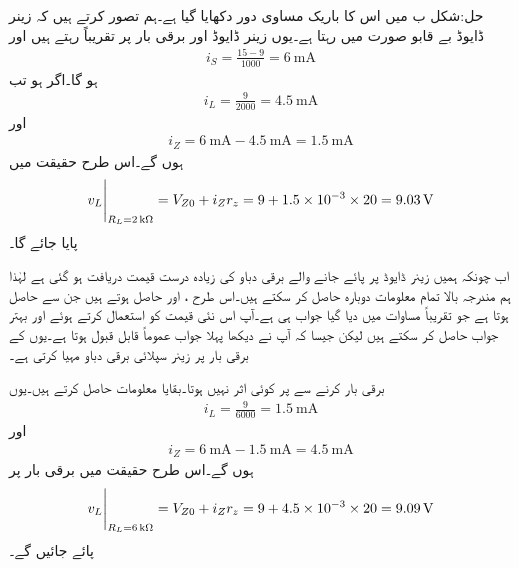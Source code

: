 حل:شکل  ب میں اس کا باریک مساوی دور دکھایا گیا ہے۔ہم تصور کرتے ہیں کہ زینر ڈایوڈ بے قابو صورت میں رہتا ہے۔یوں زینر ڈایوڈ اور برقی بار پر تقریباً  رہتے ہیں اور
\begin{align*}
i_S=\frac{15-9}{1000}=\SI{6}{\milli \ampere}
\end{align*}
ہو گا۔اگر  ہو تب
\begin{align*}
i_L=\frac{9}{2000}=\SI{4.5}{\milli \ampere}
\end{align*}
اور
\begin{align*}
i_Z=\SI{6}{\milli \ampere}-\SI{4.5}{\milli \ampere}=\SI{1.5}{\milli \ampere}
\end{align*}
ہوں گے۔اس طرح حقیقت میں
\begin{align}\label{مساوات_ڈایوڈ_زینر_سپلائی_جواب}
\eval{v_{L}}_{R_L=\SI{2}{\kilo \ohm}}=V_{Z0}+i_Z r_z=9+1.5 \times 10^{-3} \times 20=\SI{9.03}{\volt}
\end{align}
پایا جائے گا۔

اب چونکہ ہمیں زینر ڈایوڈ پر پائے جانے والے برقی دباو کی زیادہ درست قیمت دریافت ہو گئی ہے لہٰذا ہم مندرجہ بالا تمام معلومات دوبارہ حاصل کر سکتے  ہیں۔اس طرح ،   اور  حاصل ہوتے ہیں جن سے  حاصل ہوتا ہے جو تقریباً مساوات  میں دیا گیا جواب ہی ہے۔آپ اس نئی قیمت کو استعمال کرتے ہوئے اور بہتر جواب حاصل کر سکتے ہیں لیکن جیسا کہ آپ نے دیکھا پہلا جواب عموماً قابل قبول ہوتا ہے۔یوں  کے برقی بار پر زینر سپلائی  برقی دباو مہیا کرتی ہے۔

برقی بار  کرنے سے  پر کوئی اثر نہیں ہوتا۔بقایا معلومات حاصل کرتے ہیں۔یوں
\begin{align*}
i_L=\frac{9}{6000}=\SI{1.5}{\milli \ampere}
\end{align*}
اور
\begin{align*}
i_Z=\SI{6}{\milli \ampere}-\SI{1.5}{\milli \ampere}=\SI{4.5}{\milli \ampere}
\end{align*}
ہوں گے۔اس طرح حقیقت میں برقی بار پر
\begin{align}\label{مساوات_ڈایوڈ_زینر_سپلائی_جواب_الف}
\eval{v_{L}}_{R_L=\SI{6}{\kilo \ohm}}=V_{Z0}+i_Z r_z=9+4.5 \times 10^{-3} \times 20=\SI{9.09}{\volt}
\end{align}
پائے جائیں گے۔


